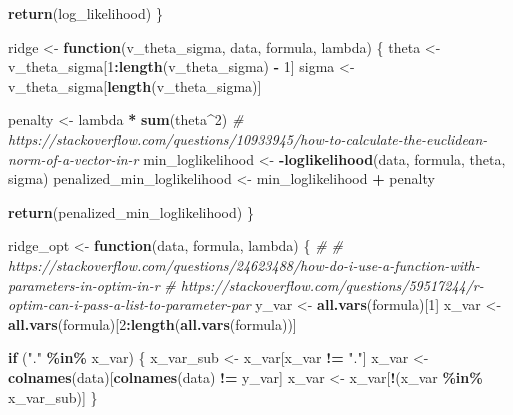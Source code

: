 \documentclass[
]{article}
\newenvironment{Shaded}{\begin{snugshade}}{\end{snugshade}}
\newcommand{\CommentTok}[1]{\textcolor[rgb]{0.56,0.35,0.01}{\textit{#1}}}
\newcommand{\ControlFlowTok}[1]{\textcolor[rgb]{0.13,0.29,0.53}{\textbf{#1}}}
\newcommand{\DecValTok}[1]{\textcolor[rgb]{0.00,0.00,0.81}{#1}}
\newcommand{\FunctionTok}[1]{\textcolor[rgb]{0.13,0.29,0.53}{\textbf{#1}}}
\newcommand{\NormalTok}[1]{#1}
\newcommand{\OtherTok}[1]{\textcolor[rgb]{0.56,0.35,0.01}{#1}}
\newcommand{\SpecialCharTok}[1]{\textcolor[rgb]{0.81,0.36,0.00}{\textbf{#1}}}
\newcommand{\StringTok}[1]{\textcolor[rgb]{0.31,0.60,0.02}{#1}}
\begin{document}
\begin{Shaded}
\begin{Highlighting}[]
  \FunctionTok{return}\NormalTok{(log\_likelihood)}
\NormalTok{\}}

\NormalTok{ridge }\OtherTok{\textless{}{-}} \ControlFlowTok{function}\NormalTok{(v\_theta\_sigma, data, formula, lambda) \{}
\NormalTok{  theta }\OtherTok{\textless{}{-}}\NormalTok{ v\_theta\_sigma[}\DecValTok{1}\SpecialCharTok{:}\FunctionTok{length}\NormalTok{(v\_theta\_sigma) }\SpecialCharTok{{-}} \DecValTok{1}\NormalTok{]}
\NormalTok{  sigma }\OtherTok{\textless{}{-}}\NormalTok{ v\_theta\_sigma[}\FunctionTok{length}\NormalTok{(v\_theta\_sigma)]}
  
\NormalTok{  penalty }\OtherTok{\textless{}{-}}\NormalTok{ lambda }\SpecialCharTok{*} \FunctionTok{sum}\NormalTok{(theta}\SpecialCharTok{\^{}}\DecValTok{2}\NormalTok{) }\CommentTok{\# https://stackoverflow.com/questions/10933945/how{-}to{-}calculate{-}the{-}euclidean{-}norm{-}of{-}a{-}vector{-}in{-}r}
\NormalTok{  min\_loglikelihood }\OtherTok{\textless{}{-}} \SpecialCharTok{{-}}\FunctionTok{loglikelihood}\NormalTok{(data, formula, theta, sigma)}
\NormalTok{  penalized\_min\_loglikelihood }\OtherTok{\textless{}{-}}\NormalTok{ min\_loglikelihood }\SpecialCharTok{+}\NormalTok{ penalty}
  
  \FunctionTok{return}\NormalTok{(penalized\_min\_loglikelihood)}
\NormalTok{\}}

\NormalTok{ridge\_opt }\OtherTok{\textless{}{-}} \ControlFlowTok{function}\NormalTok{(data, formula, lambda) \{}
  \CommentTok{\# \# https://stackoverflow.com/questions/24623488/how{-}do{-}i{-}use{-}a{-}function{-}with{-}parameters{-}in{-}optim{-}in{-}r}
  \CommentTok{\# https://stackoverflow.com/questions/59517244/r{-}optim{-}can{-}i{-}pass{-}a{-}list{-}to{-}parameter{-}par}
\NormalTok{  y\_var }\OtherTok{\textless{}{-}} \FunctionTok{all.vars}\NormalTok{(formula)[}\DecValTok{1}\NormalTok{]}
\NormalTok{  x\_var }\OtherTok{\textless{}{-}} \FunctionTok{all.vars}\NormalTok{(formula)[}\DecValTok{2}\SpecialCharTok{:}\FunctionTok{length}\NormalTok{(}\FunctionTok{all.vars}\NormalTok{(formula))]}
  
  \ControlFlowTok{if}\NormalTok{ (}\StringTok{"."} \SpecialCharTok{\%in\%}\NormalTok{ x\_var) \{}
\NormalTok{    x\_var\_sub }\OtherTok{\textless{}{-}}\NormalTok{ x\_var[x\_var }\SpecialCharTok{!=} \StringTok{"."}\NormalTok{]}
\NormalTok{    x\_var }\OtherTok{\textless{}{-}} \FunctionTok{colnames}\NormalTok{(data)[}\FunctionTok{colnames}\NormalTok{(data) }\SpecialCharTok{!=}\NormalTok{ y\_var]}
\NormalTok{    x\_var }\OtherTok{\textless{}{-}}\NormalTok{ x\_var[}\SpecialCharTok{!}\NormalTok{(x\_var }\SpecialCharTok{\%in\%}\NormalTok{ x\_var\_sub)]}
\NormalTok{  \}}
  

\end{Highlighting}
\end{Shaded}
\end{document}
